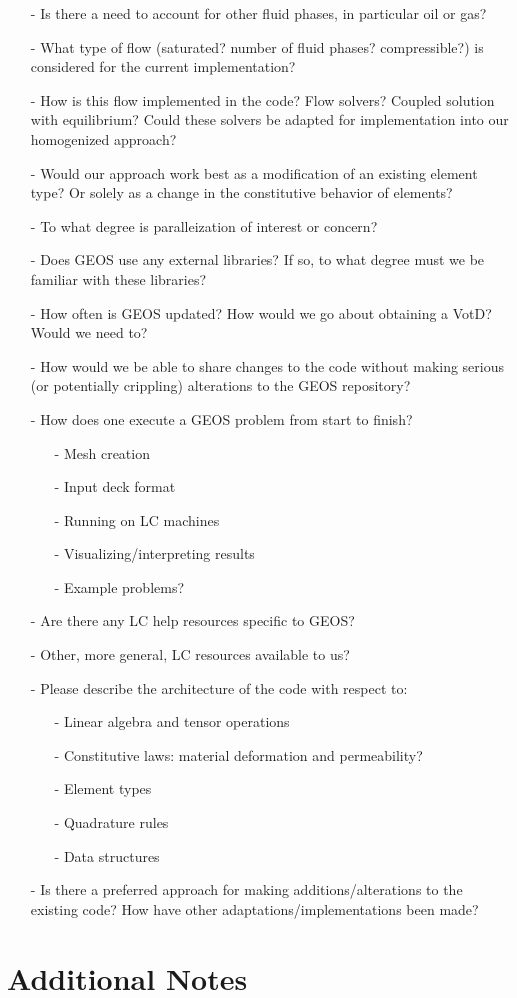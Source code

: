 \documentclass[11pt]{article} %
\begin{document}
\begin{itemize}
	\item[-] Is there a need to account for other fluid phases, in particular oil or gas?
	\item[-] What type of flow (saturated? number of fluid phases? compressible?) is considered for the current implementation?
	\item[-] How is this flow implemented in the code? Flow solvers? Coupled solution with equilibrium? Could these solvers be adapted for implementation into our homogenized approach?
	\item[-] Would our approach work best as a modification of an existing element type? Or solely as a change in the constitutive behavior of elements?
	\item[-] To what degree is paralleization of interest or concern?
	\item[-] Does GEOS use any external libraries? If so, to what degree must we be familiar with these libraries?
	\item[-] How often is GEOS updated? How would we go about obtaining a VotD? Would we need to?
	\item[-] How would we be able to share changes to the code without making serious (or potentially crippling) alterations to the GEOS repository?
	\item[-] How does one execute a GEOS problem from start to finish?
	\begin{itemize}
		\item[-] Mesh creation
		\item[-] Input deck format
		\item[-] Running on LC machines
		\item[-] Visualizing/interpreting results
		\item[-] Example problems?
	\end{itemize}
	\item[-] Are there any LC help resources specific to GEOS?
	\item[-] Other, more general, LC resources available to us?
	\item[-] Please describe the architecture of the code with respect to:
	\begin{itemize}
		\item[-] Linear algebra and tensor operations
		\item[-] Constitutive laws: material deformation and permeability?
		\item[-] Element types
		\item[-] Quadrature rules
		\item[-] Data structures
	\end{itemize}
	\item[-] Is there a preferred approach for making additions/alterations to the existing code? How have other adaptations/implementations been made?
\end{itemize}

\section{Additional Notes}
\end{document}
